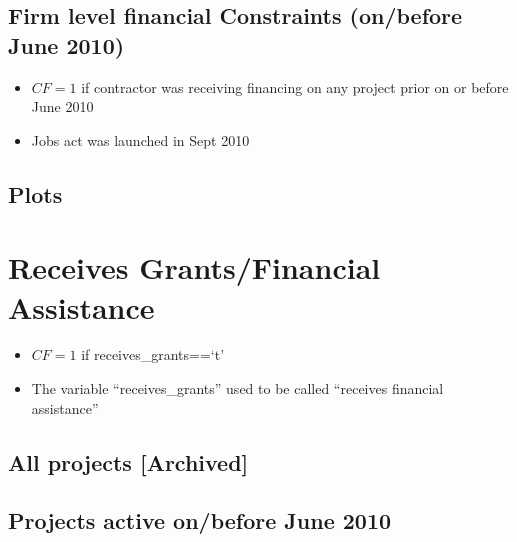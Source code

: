 \documentclass[
]{article}
\providecommand{\tightlist}{%
  \setlength{\itemsep}{0pt}\setlength{\parskip}{0pt}}
\begin{document}
\hypertarget{firm-level-financial-constraints-onbefore-june-2010}{%
\subsection{Firm level financial Constraints (on/before June
2010)}\label{firm-level-financial-constraints-onbefore-june-2010}}

\begin{itemize}
\tightlist
\item
  \(CF=1\) if contractor was receiving financing on any project prior on
  or before June 2010
\item
  Jobs act was launched in Sept 2010
\end{itemize}

\hypertarget{plots}{%
\subsection{Plots}\label{plots}}

\hypertarget{receives-grantsfinancial-assistance}{%
\section{Receives Grants/Financial
Assistance}\label{receives-grantsfinancial-assistance}}

\begin{itemize}
\tightlist
\item
  \(CF=1\) if receives\_grants==`t'
\item
  The variable ``receives\_grants'' used to be called ``receives
  financial assistance''
\end{itemize}

\hypertarget{all-projects-archived}{%
\subsection{All projects {[}Archived{]}}\label{all-projects-archived}}

\hypertarget{projects-active-onbefore-june-2010-1}{%
\subsection{Projects active on/before June
2010}\label{projects-active-onbefore-june-2010-1}}
\end{document}
